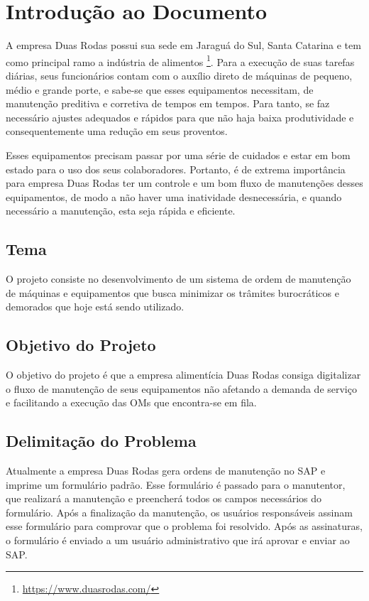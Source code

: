 \chapter{Introdução ao Documento}

A empresa Duas Rodas possui sua sede em Jaraguá do Sul, Santa Catarina e tem como principal ramo a indústria de alimentos \footnote{\url{ https://www.duasrodas.com/}}. Para a execução de suas tarefas diárias, seus funcionários contam com o auxílio direto de máquinas de pequeno, médio e grande porte, e sabe-se que esses equipamentos necessitam, de manutenção preditiva e corretiva  de tempos em tempos. Para tanto, se faz necessário ajustes adequados e rápidos para que não haja baixa produtividade e consequentemente uma redução em seus proventos.

Esses equipamentos precisam passar por uma série de cuidados e estar em bom estado para o uso dos seus colaboradores. Portanto, é de extrema importância para empresa Duas Rodas ter um controle e um bom fluxo de manutenções desses equipamentos, de modo a não haver uma inatividade desnecessária, e quando necessário a manutenção, esta seja rápida e eficiente.

\section{Tema}
O projeto consiste no desenvolvimento de um sistema de ordem de manutenção de máquinas e equipamentos que busca minimizar os trâmites burocráticos e demorados que hoje está sendo utilizado.

\section{Objetivo do Projeto}
O objetivo do projeto é que a empresa alimentícia Duas Rodas consiga digitalizar
o fluxo de manutenção de seus equipamentos não afetando a demanda de serviço e facilitando a execução das OMs que encontra-se em fila.

\section{Delimitação do Problema}
Atualmente a empresa Duas Rodas gera ordens de manutenção no SAP e imprime um formulário padrão. Esse formulário é passado para o manutentor, que realizará a manutenção e preencherá todos os campos necessários do formulário. Após a finalização da manutenção, os usuários responsáveis assinam esse formulário para comprovar que o problema foi resolvido. Após as assinaturas, o formulário é enviado a um usuário administrativo que irá aprovar e enviar ao SAP.

